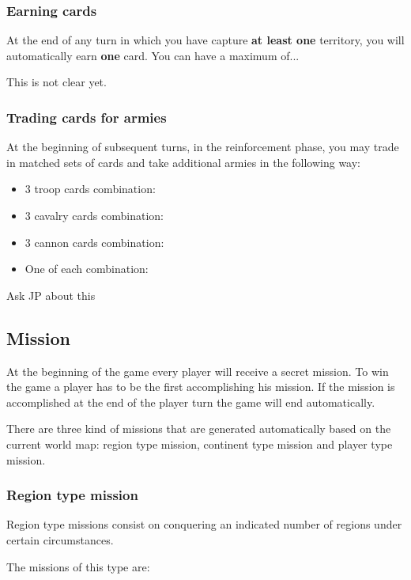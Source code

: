 \documentclass[12pt,a4paper]{article}
\begin{document}
\subsubsection{Earning cards}
At the end of any turn in which you have capture {\bf at least one} territory, you will automatically earn {\bf one} card. You can have a maximum of...

\begin{todo}[Alberto]
  This is not clear yet.
\end{todo}

\subsubsection{Trading cards for armies}
At the beginning of subsequent turns, in the reinforcement phase, you may trade in matched sets of cards and take additional armies in the following way:
 
\begin{itemize}
\item 3 troop cards combination:
\item 3 cavalry cards combination:
\item 3 cannon cards combination:
\item One of each combination:
\end{itemize}

\begin{todo}[Alberto]
  Ask JP about this
\end{todo}

\subsection{Mission}
At the beginning of the game every player will receive a secret mission. To win the game a player has to be the first accomplishing his mission. If the mission is accomplished at the end of the player turn the game will end automatically.

There are three kind of missions that are generated automatically based on the current world map: region type mission, continent type mission and player type mission.

\subsubsection{Region type mission}
Region type missions consist on conquering an indicated number of regions under certain circumstances.

The missions of this type are:
\end{document}
